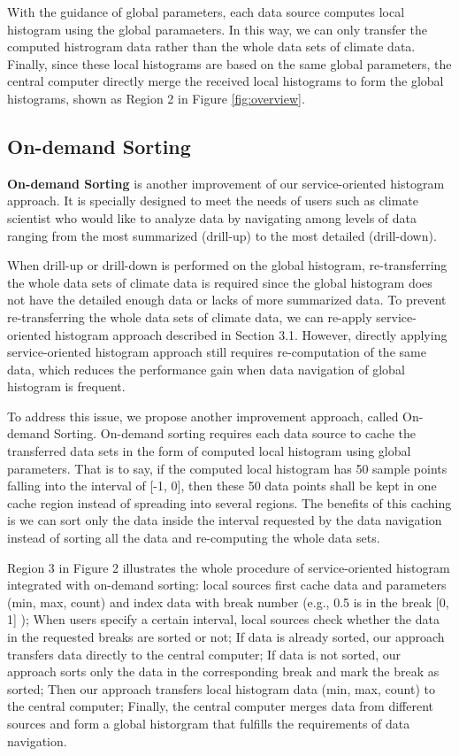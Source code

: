 \documentclass[times, 10pt,onecolumn]{article} %
\begin{document}
With the guidance of global parameters, each data source computes local histogram using the global paramaeters. In this way, we can only transfer the computed histrogram data rather than the whole data sets of climate data. Finally, since these local histograms are based on the same global parameters, the central computer directly merge the received local histograms to form the global histograms, shown as Region 2 in Figure \ref{fig:overview}.


\subsection{On-demand Sorting}
\textbf{On-demand Sorting} is another improvement of our service-oriented histogram approach. It is specially designed to meet the needs of users such as climate scientist who would like to analyze data by navigating among levels of data ranging from the most summarized (drill-up) to the most detailed (drill-down). 

When drill-up or drill-down is performed on the global histogram, re-transferring the whole data sets of climate data is required since the global histogram does not have the detailed enough data or lacks of more summarized data. To prevent re-transferring the whole data sets of climate data, we can re-apply service-oriented histogram approach described in Section 3.1. However, directly applying service-oriented histogram approach still requires re-computation of the same data, which reduces the performance gain when data navigation of global histogram is frequent.

To address this issue, we propose another improvement approach, called On-demand Sorting. On-demand sorting requires each data source to cache the transferred data sets in the form of computed local histogram using global parameters. That is to say, if the computed local histogram has 50 sample points falling into the interval of [-1, 0], then these 50 data points shall be kept in one cache region instead of spreading into several regions. The benefits of this caching is we can sort only the data inside the interval requested by the data navigation instead of sorting all the data and re-computing the whole data sets.  

Region 3 in Figure 2 illustrates the whole procedure of service-oriented histogram integrated with on-demand sorting: local sources first cache data and parameters (min, max, count) and index data with break number (e.g., 0.5 is in the break [0, 1] ); When users specify a certain interval, local sources check whether the data in the requested breaks are sorted or not; If data is already sorted, our approach transfers data directly to the central computer; If data is not sorted, our approach sorts only the data in the corresponding break and mark the break as sorted; Then our approach transfers local histogram data (min, max, count) to the central computer; Finally, the central computer merges data from different sources and form a global historgram that fulfills the requirements of data navigation.
\end{document}
